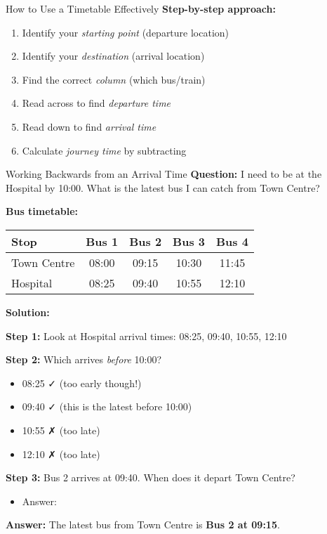 \documentclass[12pt,a4paper]{article}
\begin{document}
\begin{tipbox}{How to Use a Timetable Effectively}
\textbf{Step-by-step approach:}
\begin{enumerate}[leftmargin=*]
\item Identify your \textit{starting point} (departure location)
\item Identify your \textit{destination} (arrival location)
\item Find the correct \textit{column} (which bus/train)
\item Read across to find \textit{departure time}
\item Read down to find \textit{arrival time}
\item Calculate \textit{journey time} by subtracting
\end{enumerate}
\end{tipbox}

\begin{examplebox}{Working Backwards from an Arrival Time}
\textbf{Question:} I need to be at the Hospital by 10:00. What is the latest bus I can catch from Town Centre?

\textbf{Bus timetable:}
\begin{center}
\begin{tabular}{l|cccc}
\toprule
\textbf{Stop} & \textbf{Bus 1} & \textbf{Bus 2} & \textbf{Bus 3} & \textbf{Bus 4} \\
\midrule
Town Centre & 08:00 & 09:15 & 10:30 & 11:45 \\
Hospital & 08:25 & 09:40 & 10:55 & 12:10 \\
\bottomrule
\end{tabular}
\end{center}

\textbf{Solution:}

\textbf{Step 1:} Look at Hospital arrival times: 08:25, 09:40, 10:55, 12:10

\textbf{Step 2:} Which arrives \textit{before} 10:00?
\begin{itemize}
\item 08:25 ✓ (too early though!)
\item 09:40 ✓ (this is the latest before 10:00)
\item 10:55 ✗ (too late)
\item 12:10 ✗ (too late)
\end{itemize}

\textbf{Step 3:} Bus 2 arrives at 09:40. When does it depart Town Centre?
\begin{itemize}
\item Answer: 
\end{itemize}

\textbf{Answer:} The latest bus from Town Centre is \textbf{Bus 2 at 09:15}.
\end{examplebox}
\end{document}

